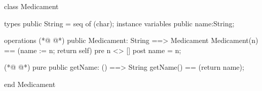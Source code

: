 \begin{vdmpp}[breaklines=true]
class Medicament

types
 public String = seq of (char);
instance variables
  public name:String;
  
operations
(*@
\label{Medicament:9}
@*)
 public Medicament: String ==> Medicament
  Medicament(n) == (name := n; return self)
 pre n <> []
 post name = n;
 
(*@
\label{getName:14}
@*)
 pure public getName: () ==> String
  getName() == (return name);

end Medicament
\end{vdmpp}
